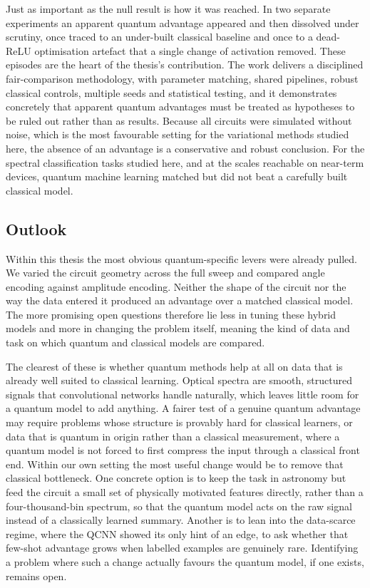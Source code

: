 Just as important as the null result is how it was reached. In two separate experiments
an apparent quantum advantage appeared and then dissolved under scrutiny, once traced
to an under-built classical baseline and once to a dead-ReLU optimisation artefact that
a single change of activation removed. These episodes are the heart of the thesis's
contribution. The work delivers a disciplined fair-comparison methodology, with
parameter matching, shared pipelines, robust classical controls, multiple seeds and
statistical testing, and it demonstrates concretely that apparent quantum advantages
must be treated as hypotheses to be ruled out rather than as results. Because all
circuits were simulated without noise, which is the most favourable setting for the
variational methods studied here, the absence of an advantage is a conservative and
robust conclusion. For the
spectral classification tasks studied here, and at the scales reachable on near-term
devices, quantum machine learning matched but did not beat a carefully built classical
model.

\subsection{Outlook}
\label{sec:conclusion_outlook}

Within this thesis the most obvious quantum-specific levers were already pulled. We
varied the circuit geometry across the full sweep and compared angle encoding against
amplitude encoding. Neither the shape of the circuit nor the way the data entered it
produced an advantage over a matched classical model. The more promising open questions
therefore lie less in tuning these hybrid models and more in changing the problem itself,
meaning the kind of data and task on which quantum and classical models are compared.

The clearest of these is whether quantum methods help at all on data that is already
well suited to classical learning. Optical spectra are smooth, structured signals that
convolutional networks handle naturally, which leaves little room for a quantum model to
add anything. A fairer test of a genuine quantum advantage may require problems whose
structure is provably hard for classical learners, or data that is quantum in origin
rather than a classical measurement, where a quantum model is not forced to first
compress the input through a classical front end. Within our own setting the most useful
change would be to remove that classical bottleneck. One concrete option is to keep the
task in astronomy but feed the circuit a small set of physically motivated features
directly, rather than a four-thousand-bin spectrum, so that the quantum model acts on the
raw signal instead of a classically learned summary. Another is to lean into the
data-scarce regime, where the QCNN showed its only hint of an edge, to ask whether that
few-shot advantage grows when labelled examples are genuinely rare. Identifying a problem
where such a change actually favours the quantum model, if one exists, remains open.

